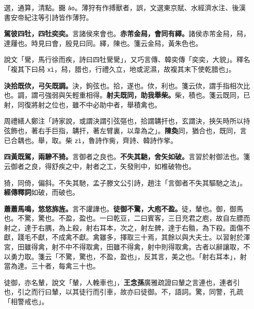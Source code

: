 \begin{quoting}選，通算，清點。嚻 \texttt{áo}。薄狩有作搏獸者，誤，文選東京賦、水經濟水注、後漢書安帝紀注等引詩皆作薄狩。\end{quoting}

\textbf{駕彼四牡，四牡奕奕。}{\footnotesize 言諸侯來會也。}\textbf{赤芾金舄，會同有繹。}{\footnotesize 諸侯赤芾金舄，舄，達屨也。時見曰會，殷見曰同。繹，陳也。箋云金舄，黃朱色也。}

\begin{quoting}說文「䮸，馬行徐而疾，詩曰四牡䮸䮸」，又巧言傳、韓奕傳「奕奕，大貌」。釋名「複其下曰舄 \texttt{xì}，舄，腊也，行禮久立，地或泥濕，故複其末下使乾腊也」。\end{quoting}

\textbf{決拾既佽，弓矢既調。}{\footnotesize 決，鉤弦也。拾，遂也。佽，利也。箋云佽，謂手指相次比也。調，謂弓強弱與矢輕重相得。}\textbf{射夫既同，助我舉柴。}{\footnotesize 柴，積也。箋云既同，已射，同復將射之位也，雖不中必助中者，舉積禽也。}

\begin{quoting}周禮繕人鄭注「詩家說，或謂決謂引弦彄也，拾謂韝扞也，玄謂決，挾矢時所以持弦飾也，著右手巨指，韝扞，著左臂裏，以韋為之」。\textbf{陳奐}同，猶合也，既同，言已合耦也。舉，取。柴 \texttt{zì}，魯詩作胔，齊詩、韓詩作㧘。\end{quoting}

\textbf{四黃既駕，兩驂不猗。}{\footnotesize 言御者之良也。}\textbf{不失其馳，舍矢如破。}{\footnotesize 言習於射御法也。箋云御者之良，得舒疾之中，射者之工，矢發則中，如椎破物也。}

\begin{quoting}猗，同倚，偏斜。不失其馳，孟子滕文公引詩，趙注「言御者不失其驅馳之法」。\textbf{經傳釋詞}如破，而破也。\end{quoting}

\textbf{蕭蕭馬鳴，悠悠旆旌。}{\footnotesize 言不讙譁也。}\textbf{徒御不驚，大庖不盈。}{\footnotesize 徒，輦也。御，御馬也。不驚，驚也。不盈，盈也。一曰乾豆，二曰賓客，三日充君之庖，故自左膘而射之，達于右腢，為上殺，射右耳本，次之，射左髀，達于右䯚，為下殺。面傷不獻，踐毛不獻，不成禽不獻。禽雖多，擇取三十焉，其餘以與大夫士。以習射於澤宮，田雖得禽，射不中不得取禽，田雖不得禽，射中則得取禽。古者以辭讓取，不以勇力取。箋云「不驚，驚也，不盈，盈也」，反其言，美之也。「射右耳本」，射當為達。三十者，每禽三十也。}

\begin{quoting}徒御，亦名輦，說文「輦，人輓車也」，\textbf{王念孫}廣雅疏證曰輦之言連也，連者引也，引之而行曰輦，以其徒行而引車，故亦曰徒御。不，語詞。驚，同警，孔疏「相警戒也」。\end{quoting}

